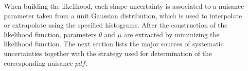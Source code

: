 When building the likelihood, each shape uncertainty is associated to a nuisance parameter taken from a unit Gaussian distribution, which is used to interpolate or extrapolate using the specified histograms. After the construction of the likelihood function, parameters $\theta$ and $\mu$ are extracted by minimizing the likelihood function. The next section lists the major sources of systematic uncertainties together with the strategy used for determination of the corresponding nuisance $pdf$.                                                                                                                                                                                                                                                                                                                                                                                                                                                                                                                                                                                                                                                                                                                                                                                                                                                                                                                                                                                                                                                                                                                                                                                                                                                                                                                                                                                                                                                                                                                                                                                                                                                                                                                                                                                                                                                                                                                                                                                                                                                                                                                                                                                                                                                                                                                                                        




